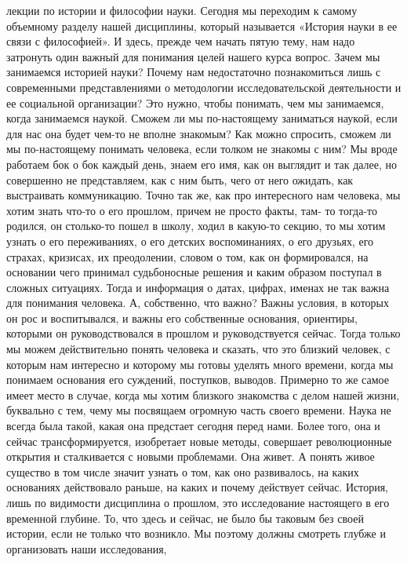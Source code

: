  лекции по истории и философии науки. Сегодня мы переходим к самому объемному
разделу нашей дисциплины, который называется «История науки в ее связи с
философией». И здесь, прежде чем начать пятую тему, нам надо затронуть один
важный для понимания целей нашего курса вопрос. Зачем мы занимаемся историей
науки? Почему нам недостаточно познакомиться лишь с современными представлениями
о методологии исследовательской деятельности и ее социальной организации? Это
нужно, чтобы понимать, чем мы занимаемся, когда занимаемся наукой. Сможем ли мы
по-настоящему заниматься наукой, если для нас она будет чем-то не вполне
знакомым? Как можно спросить, сможем ли мы по-настоящему понимать человека, если
толком не знакомы с ним? Мы вроде работаем бок о бок каждый день, знаем его имя,
как он выглядит и так далее, но совершенно не представляем, как с ним быть, чего
от него ожидать, как выстраивать коммуникацию. Точно так же, как про интересного
нам человека, мы хотим знать что-то о его прошлом, причем не просто факты, там-
то тогда-то родился, он столько-то пошел в школу, ходил в какую-то секцию, то мы
хотим узнать о его переживаниях, о его детских воспоминаниях, о его друзьях, его
страхах, кризисах, их преодолении, словом о том, как он формировался, на
основании чего принимал судьбоносные решения и каким образом поступал в сложных
ситуациях. Тогда и информация о датах, цифрах, именах не так важна для понимания
человека. А, собственно, что важно? Важны условия, в которых он рос и
воспитывался, и важны его собственные основания, ориентиры, которыми он
руководствовался в прошлом и руководствуется сейчас. Тогда только мы можем
действительно понять человека и сказать, что это близкий человек, с которым нам
интересно и которому мы готовы уделять много времени, когда мы понимаем
основания его суждений, поступков, выводов. Примерно то же самое имеет место в
случае, когда мы хотим близкого знакомства с делом нашей жизни, буквально с тем,
чему мы посвящаем огромную часть своего времени. Наука не всегда была такой,
какая она предстает сегодня перед нами. Более того, она и сейчас
трансформируется, изобретает новые методы, совершает революционные открытия и
сталкивается с новыми проблемами. Она живет. А понять живое существо в том числе
значит узнать о том, как оно развивалось, на каких основаниях действовало
раньше, на каких и почему действует сейчас. История, лишь по видимости
дисциплина о прошлом, это исследование настоящего в его временной глубине. То,
что здесь и сейчас, не было бы таковым без своей истории, если не только что
возникло. Мы поэтому должны смотреть глубже и организовать наши исследования,
